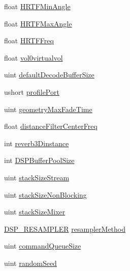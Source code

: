 \begin{DoxyCompactItemize}
\item 
float \hyperlink{struct_f_m_o_d_1_1_a_d_v_a_n_c_e_d_s_e_t_t_i_n_g_s_a36a5a0134fc5c91fefdbfe3e24034a03}{H\+R\+T\+F\+Min\+Angle}
\item 
float \hyperlink{struct_f_m_o_d_1_1_a_d_v_a_n_c_e_d_s_e_t_t_i_n_g_s_a88fdbb9b8c659246b9177e494d13a7bf}{H\+R\+T\+F\+Max\+Angle}
\item 
float \hyperlink{struct_f_m_o_d_1_1_a_d_v_a_n_c_e_d_s_e_t_t_i_n_g_s_a773bc406bbb6a83e7b6c4b6841a20256}{H\+R\+T\+F\+Freq}
\item 
float \hyperlink{struct_f_m_o_d_1_1_a_d_v_a_n_c_e_d_s_e_t_t_i_n_g_s_ace01c3fa9a58fedc999889e1f961000e}{vol0virtualvol}
\item 
uint \hyperlink{struct_f_m_o_d_1_1_a_d_v_a_n_c_e_d_s_e_t_t_i_n_g_s_a998bcb06309ebf4cc89dd235433f8e12}{default\+Decode\+Buffer\+Size}
\item 
ushort \hyperlink{struct_f_m_o_d_1_1_a_d_v_a_n_c_e_d_s_e_t_t_i_n_g_s_a1e5f0787e0fa1d9638b60e5b1d254591}{profile\+Port}
\item 
uint \hyperlink{struct_f_m_o_d_1_1_a_d_v_a_n_c_e_d_s_e_t_t_i_n_g_s_a45c71ffe14927bcb7904812081d18b31}{geometry\+Max\+Fade\+Time}
\item 
float \hyperlink{struct_f_m_o_d_1_1_a_d_v_a_n_c_e_d_s_e_t_t_i_n_g_s_ab23def9cd9737d4034839f95e44629c3}{distance\+Filter\+Center\+Freq}
\item 
int \hyperlink{struct_f_m_o_d_1_1_a_d_v_a_n_c_e_d_s_e_t_t_i_n_g_s_a6f123226c85fa1a013b44a868be7c3e7}{reverb3\+Dinstance}
\item 
int \hyperlink{struct_f_m_o_d_1_1_a_d_v_a_n_c_e_d_s_e_t_t_i_n_g_s_a43710c4e497a437ae3fcb51fa3a8e4bb}{D\+S\+P\+Buffer\+Pool\+Size}
\item 
uint \hyperlink{struct_f_m_o_d_1_1_a_d_v_a_n_c_e_d_s_e_t_t_i_n_g_s_a2fdae986f0011dd72930419dd276910c}{stack\+Size\+Stream}
\item 
uint \hyperlink{struct_f_m_o_d_1_1_a_d_v_a_n_c_e_d_s_e_t_t_i_n_g_s_ad8240a9d7c1ef8f91dfdea49bd049400}{stack\+Size\+Non\+Blocking}
\item 
uint \hyperlink{struct_f_m_o_d_1_1_a_d_v_a_n_c_e_d_s_e_t_t_i_n_g_s_ad565f52a5ba5eaa283a12af0deae910a}{stack\+Size\+Mixer}
\item 
\hyperlink{namespace_f_m_o_d_ad6489eb6f4c11ade07297e8939d96ac9}{D\+S\+P\+\_\+\+R\+E\+S\+A\+M\+P\+L\+ER} \hyperlink{struct_f_m_o_d_1_1_a_d_v_a_n_c_e_d_s_e_t_t_i_n_g_s_a20ecdcd14ce0d4e0a20445a3c1c2a244}{resampler\+Method}
\item 
uint \hyperlink{struct_f_m_o_d_1_1_a_d_v_a_n_c_e_d_s_e_t_t_i_n_g_s_aa0656722aaeba1620696ba3375eef7bb}{command\+Queue\+Size}
\item 
uint \hyperlink{struct_f_m_o_d_1_1_a_d_v_a_n_c_e_d_s_e_t_t_i_n_g_s_a4dd94c767903047df1c632cd0863f55c}{random\+Seed}
\end{DoxyCompactItemize}


